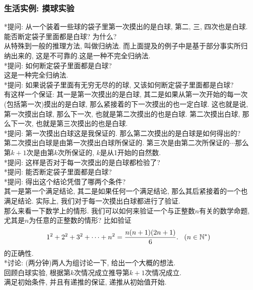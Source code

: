 \documentclass{article}
\begin{document}
\begin{CJK}{UTF8}{gkai}
\subsubsection{生活实例: 摸球实验}
*提问: 从一个装着一些球的袋子里第一次摸出的是白球, 第二, 三, 四次也是白球. 能否断定袋子里面都是白球? 为什么? \\
从特殊到一般的推理方法, 叫做归纳法. 而上面提及的例子中是基于部分事实所归纳出来的, 这是不可靠的.这是一种不完全归纳法. \\
*提问: 如何断定袋子里面都是白球?\\
这是一种完全归纳法.\\
*提问: 如果说袋子里面有无穷无尽的的球, 又该如何断定袋子里面都是白球?\\
有这样一个保证: 其一是第一次摸出的是白球, 其二是如果从第一次开始的每一次(包括第一次)摸出的是白球, 那么紧接着的下一次摸出的也一定白球. 这也就是说, 第一次摸出白球, 那么下一次, 也就是第二次摸出的也是白球. 第二次摸出白球, 那么下一次, 也就是第三次摸出的也是白球. \\
*提问: 第一次摸出白球这是我保证的. 那么第二次摸出的是白球是如何得出的?\\
第二次摸出白球是由第一次摸出白球所保证的. 第三次是由第二次所保证的$\cdots$那么第$k+1$次是由第$k$次所保证的, $k$是从1开始的自然数.\\
*提问: 这样是否对于每一次摸出的是白球都检验了?\\
*提问: 能否断定袋子里面都是白球?\\
*提问: 得出这个结论凭借了哪两个条件?\\
其一是第一个满足结论, 其二是如果任何一个满足结论, 那么其后紧接着的一个也满足结论. 实际上, 我们对于每一次摸出白球都进行了验证.\\
那么来看一下数学上的情形. 我们可以如何来验证一个与正整数$n$有关的数学命题, 尤其是$n$为任意的正整数的情形? 比如验证$$1^2 + 2^2 + 3^2 + \cdots + n^2 = \frac{n(n + 1)(2n + 1)}{6}.\hspace{3mm}(n \in \mathbb{N}^*)$$的正确性.\\
*讨论: (两分钟)两人为组讨论一下, 给出一个大概的想法.\\
回顾白球实验, 根据第$k$次情况成立推导第$k+1$次情况成立.\\
满足初始条件, 并且有递推的保证, 递推从初始值开始.\\


\end{CJK}
\end{document}

